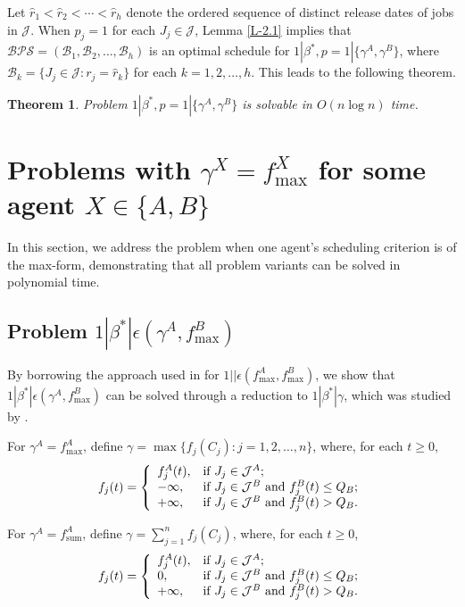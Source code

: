 \documentclass[12pt]{article}
\newtheorem{theorem}{Theorem}[section]
\begin{document}
\begin{sloppypar}
Let $\widehat{r}_1 < \widehat{r}_2 < \cdots < \widehat{r}_h$ denote the ordered sequence of distinct release dates of jobs in $\mathcal{J}$. When $p_j=1$ for each $J_j \in \mathcal{J}$, Lemma \ref{L-2.1} implies that $\mathcal{BPS}=(\mathcal{B}_1, \mathcal{B}_2, \ldots, \mathcal{B}_h)$ is an optimal schedule
for $1 | \beta^{*}, p=1|\{\gamma^A, \gamma^B\}$, where 
$\mathcal{B}_k=\{J_j \in \mathcal{J}: r_j=\widehat{r}_k\}$ for each $k=1, 2, \ldots, h$. This leads to the following theorem.

\begin{theorem} \label{T-2.2}
Problem $1 | \beta^{*}, p=1|\{\gamma^A, \gamma^B\}$ is solvable in $O(n \log n)$ time.
\end{theorem}

\section{Problems with $\gamma^X=f_{\max}^X$ for some agent $X \in \{A, B\}$}

In this section, we address the problem when one agent's scheduling criterion is of the max-form, demonstrating that all problem variants can be solved in polynomial time. 

\subsection{Problem $1 | \beta^{*} |\epsilon(\gamma^A, f_{\max}^B)$}

By borrowing the approach used in \cite{AgnetisMirchandani2004OR} for $1 | |\epsilon(f_{\max}^A, f_{\max}^B)$, we show that $1 | \beta^{*} |\epsilon(\gamma^A, f_{\max}^B)$ can be solved through a reduction to $1 | \beta^{*} | \gamma$, which was studied by \cite{ChengYuanYang2005COR}.

For $\gamma^A=f_{\max}^A$, define $\gamma=\max \{f_j(C_j): j=1, 2, \ldots, n\}$, where, for each $t \geq 0$,
\begin{equation*}\label{E-3.1}
f_j(t)=\left\{
\begin{array}{ll}
f_j^A(t), & \hbox{if} ~ J_j \in \mathcal{J}^A; \\
-\infty, & \hbox{if} ~ J_j \in \mathcal{J}^B ~ \hbox{and} ~ f_j^B(t) \leq Q_B;\\
+\infty, & \hbox{if} ~ J_j \in \mathcal{J}^B ~ \hbox{and} ~ f_j^B(t) > Q_B.
\end{array}
\right.
\end{equation*}

For $\gamma^A=f_{\mathrm{sum}}^{A}$, define $\gamma=\sum_{j=1}^n f_j(C_j)$, where, for each $t \geq 0$,
\begin{equation*}\label{E-3.2}
f_j(t)=\left\{
\begin{array}{ll}
f_j^A(t), & \hbox{if} ~ J_j \in \mathcal{J}^A; \\
0, & \hbox{if} ~ J_j \in \mathcal{J}^B ~ \hbox{and} ~ f_j^B(t) \leq Q_B;\\
+\infty, & \hbox{if} ~ J_j \in \mathcal{J}^B ~ \hbox{and} ~ f_j^B(t) > Q_B.
\end{array}
\right.
\end{equation*}


\end{sloppypar}
\end{document}
